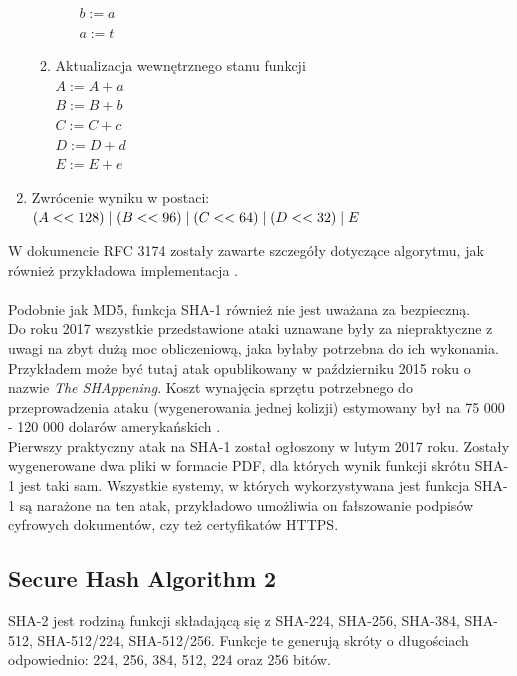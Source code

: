 \begin{enumerate}
\begin{enumerate}
\begin{enumerate}
				        $b := a$ \\
				        $a := t$
				\end{enumerate}
			\item Aktualizacja wewnętrznego stanu funkcji \\
				$A := A + a$ \\
				$B := B + b$ \\
				$C := C + c$ \\
				$D := D + d$ \\
				$E := E + e$
		\end{enumerate}
	\item Zwrócenie wyniku w postaci: \\
		$(A << 128) \mathrel{|} (B << 96) \mathrel{|} (C << 64) \mathrel{|} (D << 32) \mathrel{|} E$
\end{enumerate}
W dokumencie RFC 3174 zostały zawarte szczegóły dotyczące algorytmu, jak również przykładowa implementacja \cite{sha1rfc}. \\ \\
Podobnie jak MD5, funkcja SHA-1 również nie jest uważana za bezpieczną. \\
Do roku 2017 wszystkie przedstawione ataki uznawane były za niepraktyczne z uwagi na zbyt dużą moc obliczeniową, jaka byłaby potrzebna do ich wykonania.
Przykładem może być tutaj atak opublikowany w październiku 2015 roku o nazwie \textit{The SHAppening}. Koszt wynajęcia sprzętu potrzebnego do przeprowadzenia ataku (wygenerowania jednej kolizji) estymowany był na 75 000 - 120 000 dolarów amerykańskich \cite{shap}. \\
Pierwszy praktyczny atak na SHA-1 został ogłoszony w lutym 2017 roku. Zostały wygenerowane dwa pliki w formacie PDF, dla których wynik funkcji skrótu SHA-1 jest taki sam. Wszystkie systemy, w których wykorzystywana jest funkcja SHA-1 są narażone na ten atak, przykładowo umożliwia on fałszowanie podpisów cyfrowych dokumentów, czy też certyfikatów HTTPS. \cite{shatt}

\subsection{Secure Hash Algorithm 2}
SHA-2 jest rodziną funkcji składającą się z \mbox{SHA-224}, \mbox{SHA-256}, \mbox{SHA-384}, \mbox{SHA-512}, \mbox{SHA-512/224}, \mbox{SHA-512/256}. Funkcje te generują skróty o długościach odpowiednio: 224, 256, 384, 512, 224 oraz 256 bitów.

